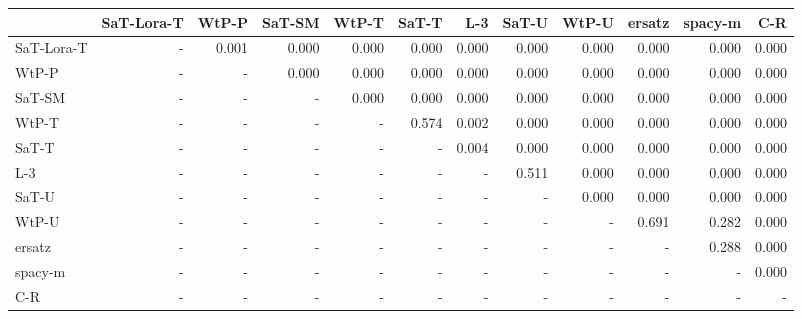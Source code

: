 \begin{tabular}{lrrrrrrrrrrr}
\toprule
 & SaT-Lora-T & WtP-P & SaT-SM & WtP-T & SaT-T & L-3 & SaT-U & WtP-U & ersatz & spacy-m & C-R \\
\midrule
SaT-Lora-T & - & 0.001 & 0.000 & 0.000 & 0.000 & 0.000 & 0.000 & 0.000 & 0.000 & 0.000 & 0.000 \\
WtP-P & - & - & 0.000 & 0.000 & 0.000 & 0.000 & 0.000 & 0.000 & 0.000 & 0.000 & 0.000 \\
SaT-SM & - & - & - & 0.000 & 0.000 & 0.000 & 0.000 & 0.000 & 0.000 & 0.000 & 0.000 \\
WtP-T & - & - & - & - & 0.574 & 0.002 & 0.000 & 0.000 & 0.000 & 0.000 & 0.000 \\
SaT-T & - & - & - & - & - & 0.004 & 0.000 & 0.000 & 0.000 & 0.000 & 0.000 \\
L-3 & - & - & - & - & - & - & 0.511 & 0.000 & 0.000 & 0.000 & 0.000 \\
SaT-U & - & - & - & - & - & - & - & 0.000 & 0.000 & 0.000 & 0.000 \\
WtP-U & - & - & - & - & - & - & - & - & 0.691 & 0.282 & 0.000 \\
ersatz & - & - & - & - & - & - & - & - & - & 0.288 & 0.000 \\
spacy-m & - & - & - & - & - & - & - & - & - & - & 0.000 \\
C-R & - & - & - & - & - & - & - & - & - & - & - \\
\bottomrule
\end{tabular}

